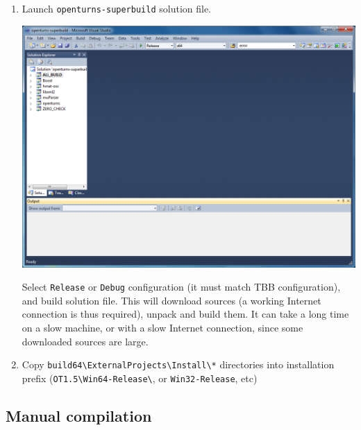 \begin{enumerate}
\item Launch \texttt{openturns-superbuild} solution file.
\begin{center}
  \includegraphics[scale=0.5]{Figures/win_native/vs-superbuild.png}
\end{center}
Select \texttt{Release} or \texttt{Debug} configuration (it must match TBB configuration), and build solution file.
This will download sources (a working Internet connection is thus required), unpack and build them.
It can take a long time on a slow machine, or with a slow Internet connection, since some downloaded sources are large.
\item Copy \verb+build64\ExternalProjects\Install\*+ directories into installation prefix (\verb+OT1.5\Win64-Release\+, or \verb+Win32-Release+,
etc)
\end{enumerate}

\subsection{Manual compilation}

